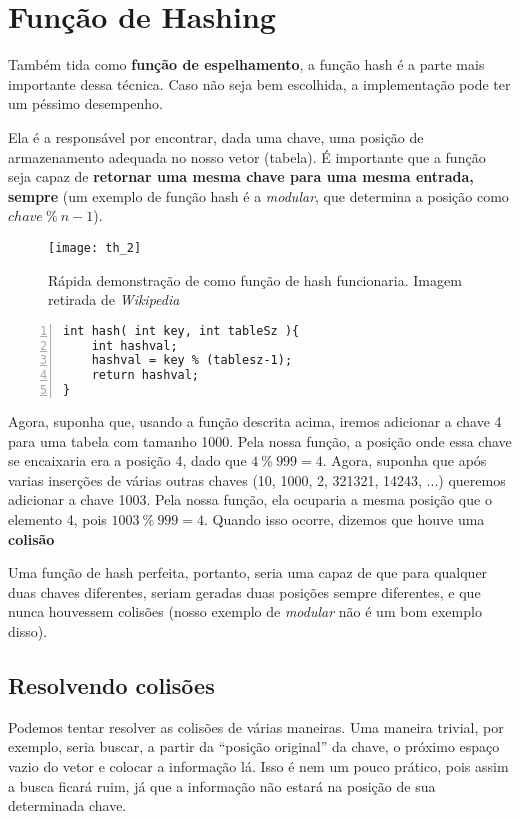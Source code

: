 \documentclass[12pt, a4paper]{article}
\begin{document}
\section{Função de Hashing}
\label{sec:hash}

Também tida como \textbf{função de espelhamento}, a função hash é a parte mais importante dessa técnica. Caso não seja bem escolhida, a implementação pode ter um péssimo desempenho.

Ela é a responsável por encontrar, dada uma chave, uma posição de armazenamento adequada no nosso vetor (tabela). É importante que a função seja capaz de \textbf{retornar uma mesma chave para uma mesma entrada, sempre} (um exemplo de função hash é a \textit{modular}, que determina a posição como $chave~\%~n-1$).

\begin{figure}[!h]
\centering
\texttt{[image: th\_2]}
\caption{Rápida demonstração de como função de hash funcionaria. Imagem retirada de \textit{Wikipedia}\cite{wiki:hash}}
\label{hash2}
\end{figure}

\begin{lstlisting}[frame=single, captionpos=b, numbers=left]
int hash( int key, int tableSz ){
	int hashval;
	hashval = key % (tablesz-1);
	return hashval;
}
\end{lstlisting}

Agora, suponha que, usando a função descrita acima, iremos adicionar a chave 4 para uma tabela com tamanho 1000. Pela nossa função, a posição onde essa chave se encaixaria era a posição 4, dado que $4~\%~999 = 4$. Agora, suponha que após varias inserções de várias outras chaves (10, 1000, 2, 321321, 14243, ...) queremos adicionar a chave 1003. Pela nossa função, ela ocuparia a mesma posição que o elemento 4, pois $1003~\%~999 = 4$. Quando isso ocorre, dizemos que houve uma \textbf{colisão}

Uma função de hash perfeita, portanto, seria uma capaz de que para qualquer duas chaves diferentes, seriam geradas duas posições sempre diferentes, e que nunca houvessem colisões (nosso exemplo de \textit{modular} não é um bom exemplo disso).

\subsection{Resolvendo colisões}
Podemos tentar resolver as colisões de várias maneiras. Uma maneira trivial, por exemplo, seria buscar, a partir da ``posição original'' da chave, o próximo espaço vazio do vetor e colocar a informação lá. Isso é nem um pouco prático, pois assim a busca ficará ruim, já que a informação não estará na posição de sua determinada chave.
\end{document}
